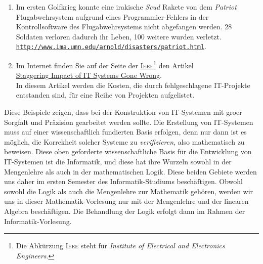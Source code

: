 \begin{enumerate}
\begin{enumerate}
            Einen detailierten Bericht \"{u}ber diese Unf\"{a}lle finden Sie unter \\[0.2cm]
            \hspace*{1.3cm} 
            \href{http://courses.cs.vt.edu/~cs3604/lib/Therac_25/Therac\_1.html}{\texttt{http://courses.cs.vt.edu/cs3604/lib/Therac\_25/Therac\_1.html}}.
      \item Im ersten Golfkrieg konnte eine irakische \textsl{Scud} Rakete von dem \textsl{Patriot}
            Flugabwehrsystem aufgrund eines Programmier-Fehlers in der Kontrollsoftware des Flugabwehrsystems
            nicht abgefangen werden.  28 Soldaten verloren dadurch ihr Leben, 100 weitere wurden
            verletzt. \\[0.2cm]
            \hspace*{1.3cm} 
            \href{http://www.ima.umn.edu/~arnold/disasters/patriot.html}{\texttt{http://www.ima.umn.edu/arnold/disasters/patriot.html}}.
      \item Im Internet finden Sie auf der Seite der
            \href{https://de.wikipedia.org/wiki/Institute_of_Electrical_and_Electronics_Engineers}{\textsc{Ieee}}\footnote{
              Die Abk\"{u}rzung \textsc{Ieee} steht f\"{u}r \emph{Institute of Electrical and Electronics Engineers}.}
            den Artikel   
            \\[0.2cm]
            \hspace*{1.3cm}
            \href{http://spectrum.ieee.org/static/the-staggering-impact-of-it-systems-gone-wrong}{Staggering Impact of IT Systems Gone Wrong}.
            \\[0.2cm]
            In diesem Artikel werden die Kosten, die durch fehlgeschlagene IT-Projekte entstanden sind, f\"{u}r eine Reihe von Projekten aufgelistet.
      \end{enumerate}
      Diese Beispiele zeigen, dass bei der Konstruktion von IT-Systemen mit gro\3er Sorgfalt
      und Pr\"{a}zision gearbeitet werden sollte.  Die Erstellung von IT-Systemen muss auf einer 
      wissenschaftlich fundierten Basis erfolgen, denn nur dann ist es m\"{o}glich, die Korrekheit
      solcher Systeme zu \emph{verifizieren}, also mathematisch zu beweisen.
      Diese oben geforderte wissenschaftliche Basis f\"{u}r die Entwicklung von IT-Systemen ist die Informatik, 
      und diese hat ihre Wurzeln sowohl in der Mengenlehre als auch in der mathematischen
      Logik.  Diese beiden Gebiete werden uns daher im ersten Semester
      des Informatik-Studiums besch\"{a}ftigen.  Obwohl sowohl die Logik als auch die Mengenlehre zur
      Mathematik geh\"{o}ren, werden wir uns in dieser Mathematik-Vorlesung nur mit der Mengenlehre und
      der linearen Algebra besch\"{a}ftigen.  Die Behandlung der Logik erfolgt dann im Rahmen der
      Informatik-Vorlesung. 
\end{enumerate}


